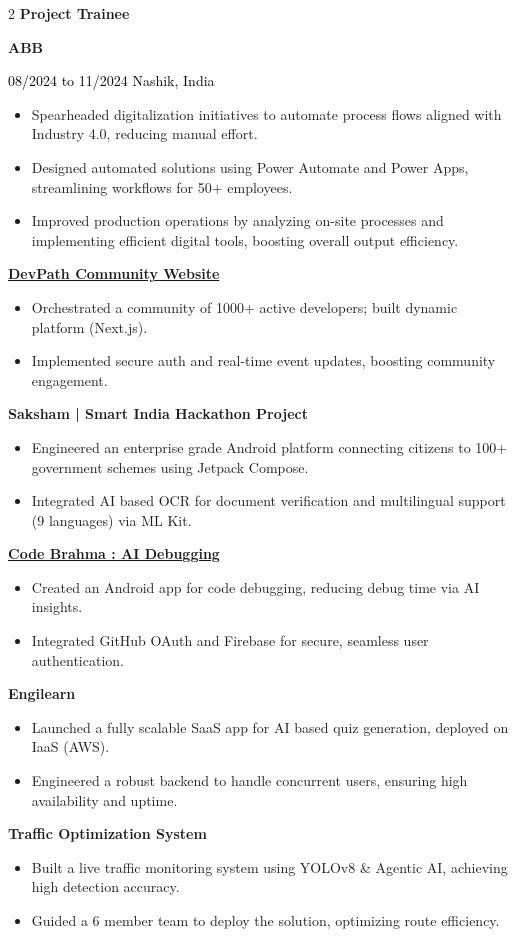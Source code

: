 \documentclass[10pt,a4paper,withhyper]{altacv}
\renewcommand{\cvevent}[4]{%
  \vspace{0.8em}
  {\normalsize\textbf{#1}} \par
  \ifstrequal{#2}{}{}{{\normalsize\rmfamily\textcolor{MyBlue}{\textbf{#2}}} \par}
  \vspace{0.25em}
  \ifstrequal{#3}{}{}{%
    \ifstrequal{#4}{}{%
      {\small\textcolor{Black}{\faCalendar* \hspace{0.2em} #3}}\par
    }{%
      {\small\textcolor{Black}{\faCalendar* \hspace{0.2em} #3 \hspace{1.5em} \faMapMarker \hspace{0.2em} #4}}\par
    }
  }
  \vspace{0.25em}
}
\begin{document}
\begin{paracol}{2}
\cvevent{Project Trainee}{ABB}{08/2024 to 11/2024}{Nashik, India}
\begin{itemize}
  \item Spearheaded digitalization initiatives to automate process flows aligned with Industry 4.0, reducing manual effort.
  \item Designed automated solutions using Power Automate and Power Apps, streamlining workflows for 50+ employees.
  \item Improved production operations by analyzing on-site processes and implementing efficient digital tools, boosting overall output efficiency.
\end{itemize}


\cvevent{\href{https://github.com/devpathindcommunity-india/DevPath-Web}{DevPath Community Website}}{}{}{}
\begin{itemize}
  \item Orchestrated a community of 1000+ active developers; built dynamic platform (Next.js).
  \item Implemented secure auth and real-time event updates, boosting community engagement.
\end{itemize}

\cvevent{Saksham | Smart India Hackathon Project}{}{}{}
\begin{itemize}
  \item Engineered an enterprise grade Android platform connecting citizens to 100+ government schemes using Jetpack Compose.
  \item Integrated AI based OCR for document verification and multilingual support (9 languages) via ML Kit.
\end{itemize}

\cvevent{\href{https://github.com/Aditya948351/CodeBrahma-An-app-for-Developers}{Code Brahma : AI Debugging}}{}{}{}
\begin{itemize}
  \item Created an Android app for code debugging, reducing debug time via AI insights.
  \item Integrated GitHub OAuth and Firebase for secure, seamless user authentication.
\end{itemize}

\cvevent{Engilearn}{}{}{}
\begin{itemize}
  \item Launched a fully scalable SaaS app for AI based quiz generation, deployed on IaaS (AWS).
  \item Engineered a robust backend to handle concurrent users, ensuring high availability and uptime.
\end{itemize}

\cvevent{Traffic Optimization System}{}{}{}
\begin{itemize}
  \item Built a live traffic monitoring system using YOLOv8 \& Agentic AI, achieving high detection accuracy.
  \item Guided a 6 member team to deploy the solution, optimizing route efficiency.
\end{itemize}

\end{paracol}
\end{document}
